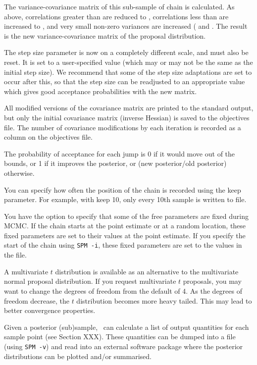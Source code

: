 The variance-covariance matrix of this sub-sample of chain is calculated. As above, correlations greater than  are reduced to , correlations less than  are increased to  , and very small non-zero variances are increased ( and . The result is the new variance-covariance matrix of the proposal distribution.

The step size parameter is now on a completely different scale, and must also be reset. It is set to a user-specified value (which may or may not be the same as the initial step size). We recommend that some of the step size adaptations are set to occur after this, so that the step size can be readjusted to an appropriate value which gives good acceptance probabilities with the new matrix. 

All modified versions of the covariance matrix are printed to the standard output, but only the initial covariance matrix (inverse Hessian) is saved to the objectives file. The number of covariance modifications by each iteration is recorded as a column on the objectives file. 

The probability of acceptance for each jump is 0 if it would move out of the bounds, or 1 if it improves the posterior, or (new posterior/old posterior) otherwise. 

You can specify how often the position of the chain is recorded using the keep parameter. For example, with keep 10, only every 10th sample is written to file. 

You have the option to specify that some of the free parameters are fixed during MCMC. If the chain starts at the point estimate or at a random location, these fixed parameters are set to their values at the point estimate. If you specify the start of the chain using \texttt{SPM -i}, these fixed parameters are set to the values in the file.

A multivariate $t$ distribution is available as an alternative to the multivariate normal proposal distribution. If you request multivariate $t$ proposals, you may want to change the degrees of freedom from the default of 4. As the degrees of freedom decrease, the $t$ distribution becomes more heavy tailed. This may lead to better convergence properties.

Given a posterior (sub)sample, \SPM\ can calculate a list of output quantities for each sample point (see Section XXX). These quantities can be dumped into a file (using \texttt{SPM -v}) and read into an external software package where the posterior distributions can be plotted and/or summarised. 

